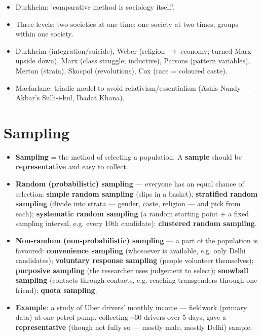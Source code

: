 \begin{QuickRevision}
\begin{itemize}
\item Durkheim: 'comparative method is sociology itself'.
\item Three levels: two societies at one time; one society at two times; groups within one society.
\item Durkheim (integration/suicide), Weber (religion $\rightarrow$ economy; turned Marx upside down), Marx (class struggle; inductive), Parsons (pattern variables), Merton (strain), Skocpol (revolutions), Cox (race = coloured caste).
\item Macfarlane: triadic model to avoid relativism/essentialism (Ashis Nandy --- Akbar's Sulh-i-kul, Ibadat Khana).
\end{itemize}
\end{QuickRevision}

\section{Sampling}

\begin{KeyConcept}
\begin{itemize}
\item \textbf{Sampling} = the method of selecting a population. A \textbf{sample} should be \textbf{representative} and easy to collect.
\item \textbf{Random (probabilistic) sampling} --- everyone has an equal chance of selection: \textbf{simple random sampling} (slips in a basket); \textbf{stratified random sampling} (divide into strata --- gender, caste, religion --- and pick from each); \textbf{systematic random sampling} (a random starting point + a fixed sampling interval, e.g. every 10th candidate); \textbf{clustered random sampling}.
\item \textbf{Non-random (non-probabilistic) sampling} --- a part of the population is favoured: \textbf{convenience sampling} (whosoever is available, e.g. only Delhi candidates); \textbf{voluntary response sampling} (people volunteer themselves); \textbf{purposive sampling} (the researcher uses judgement to select); \textbf{snowball sampling} (contacts through contacts, e.g. reaching transgenders through one friend); \textbf{quota sampling}.
\item \textbf{Example}: a study of Uber drivers' monthly income --- fieldwork (primary data) at one petrol pump, collecting \textasciitilde{}60 drivers over 5 days, gave a \textbf{representative} (though not fully so --- mostly male, mostly Delhi) sample.
\end{itemize}
\end{KeyConcept}

